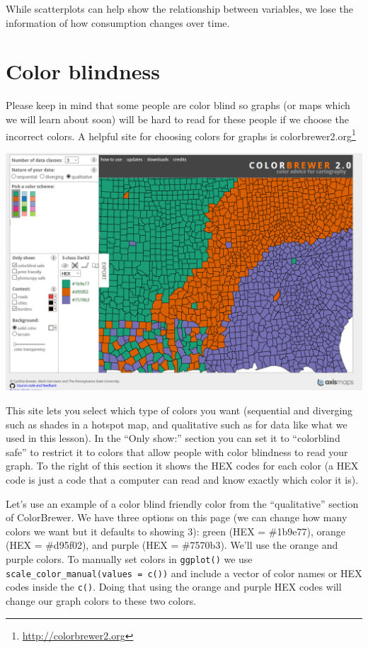 \documentclass[
]{krantz}
\renewcommand{\href}[2]{#2\footnote{\url{#1}}}
\begin{document}
While scatterplots can help show the relationship between variables, we lose the information of how consumption changes over time.

\hypertarget{color-blindness}{%
\section{Color blindness}\label{color-blindness}}

Please keep in mind that some people are color blind so graphs (or maps which we will learn about soon) will be hard to read for these people if we choose the incorrect colors. A helpful site for choosing colors for graphs is \href{http://colorbrewer2.org}{colorbrewer2.org}

\includegraphics{images/colorbrewer.PNG}

This site lets you select which type of colors you want (sequential and diverging such as shades in a hotspot map, and qualitative such as for data like what we used in this lesson). In the ``Only show:'' section you can set it to ``colorblind safe'' to restrict it to colors that allow people with color blindness to read your graph. To the right of this section it shows the HEX codes for each color (a HEX code is just a code that a computer can read and know exactly which color it is).

Let's use an example of a color blind friendly color from the ``qualitative'' section of ColorBrewer. We have three options on this page (we can change how many colors we want but it defaults to showing 3): green (HEX = \#1b9e77), orange (HEX = \#d95f02), and purple (HEX = \#7570b3). We'll use the orange and purple colors. To manually set colors in \texttt{ggplot()} we use \texttt{scale\_color\_manual(values\ =\ c())} and include a vector of color names or HEX codes inside the \texttt{c()}. Doing that using the orange and purple HEX codes will change our graph colors to these two colors.
\end{document}
